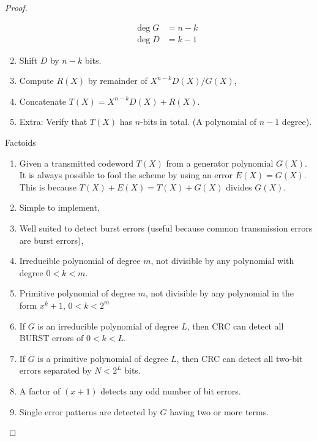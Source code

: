 \documentclass[../../main.tex]{subfiles}
\begin{document}
\begin{proof}
\begin{wtr}
\begin{enumerate}
        \begin{align}
            \deg{G} &=n-k\\
            \deg{D} &= k-1
        \end{align}
        \item Shift $D$ by $n-k$ bits.
        \item Compute $R(X)$ by remainder of $X^{n-k}D(X)/G(X)$,
        \item Concatenate $T(X) = X^{n-k}D(X) + R(X)$.
        \item Extra: Verify that $T(X)$ has $n$-bits in total. (A polynomial of $n-1$ degree).
    \end{enumerate}
    Factoids
    \begin{enumerate}
        \item Given a transmitted codeword $T(X)$ from a generator polynomial $G(X)$. It is always possible to fool the scheme by using an error $E(X) = G(X)$. This is because $T(X)+E(X) = T(X) + G(X)$ divides $G(X)$.
        \item Simple to implement,
        \item Well suited to detect burst errors (useful because common transmission errors are burst errors),
        \item Irreducible polynomial of degree $m$, not divisible by any polynomial with degree $0<k<m$.
        \item Primitive polynomial of degree $m$, not divisible by any polynomial in the form $x^k + 1$, $0<k<2^m$
        \item If $G$ is an irreducible polynomial of degree $L$, then CRC can detect all BURST errors of $0<k<L$.
        \item If $G$ is a primitive polynomial of degree $L$, then CRC can detect all two-bit errors separated by $N<2^L$ bits.
        \item A factor of $(x+1)$ detects any odd number of bit errors.
        \item Single error patterns are detected by $G$ having two or more terms.
    \end{enumerate}
\end{wtr}
\end{proof}
\end{document}
